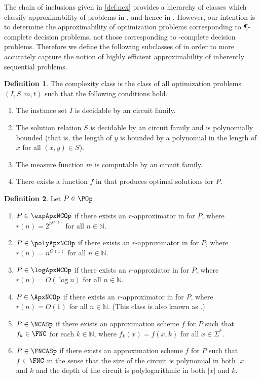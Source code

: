 \documentclass[]{article}
\theoremstyle{plain}
\theoremstyle{definition}
\newtheorem{definition}{Definition}
\begin{document}
The chain of inclusions given in \autoref{def:ncx} provides a hierarchy of classes which classify approximability of problems in \NNCO{}, and hence in \NPO.
However, our intention is to determine the approximability of optimization problems corresponding to \P-complete decision problems, not those corresponding to \NP-complete decision problems.
Therefore we define the following subclasses of \PO{} in order to more accurately capture the notion of highly efficient approximability of inherently sequential problems.

\begin{definition}\label{def:poprime}
  The complexity class \POp{} is the class of all optimization problems $(I, S, m, t)$ such that the following conditions hold.
  \begin{enumerate}
  \item The instance set $I$ is decidable by an \NC{} circuit family.
  \item The solution relation $S$ is decidable by an \NC{} circuit family and is polynomially bounded (that is, the length of $y$ is bounded by a polynomial in the length of $x$ for all $(x, y)\in S$).
  \item The measure function $m$ is computable by an \FNC{} circuit family.
  \item There exists a function $f$ in \FP{} that produces optimal solutions for $P$.
  \end{enumerate}
\end{definition}

\begin{definition}\label{def:ncxprime}
  Let $P\in\POp$.
  \begin{enumerate}
  \item $P\in\expApxNCOp$ if there exists an $r$-approximator in \FNC{} for $P$, where $r(n)=2^{n^{O(1)}}$ for all $n\in\mathbb{N}$.
  \item $P\in\polyApxNCOp$ if there exists an $r$-approximator in \FNC{} for $P$, where $r(n)=n^{O(1)}$ for all $n\in\mathbb{N}$.
  \item $P\in\logApxNCOp$ if there exists an $r$-approxiator in \FNC{} for $P$, where $r(n)=O(\log n)$ for all $n\in\mathbb{N}$.
  \item $P\in\ApxNCOp$ if there exists an $r$-approximator in \FNC{} for $P$, where $r(n)=O(1)$ for all $n\in\mathbb{N}$.
    (This class is also known as \NCX.)
  \item $P\in\NCASp$ if there exists an approximation scheme $f$ for $P$ such that $f_k\in\FNC$ for each $k\in\mathbb{N}$, where $f_k(x)=f(x, k)$ for all $x\in\Sigma^*$.
  \item $P\in\FNCASp$ if there exists an approximation scheme $f$ for $P$ such that $f\in\FNC$ in the sense that the size of the circuit is polynomial in both $|x|$ and $k$ and the depth of the circuit is polylogarithmic in both $|x|$ and $k$.
  \end{enumerate}
\end{definition}
\end{document}

